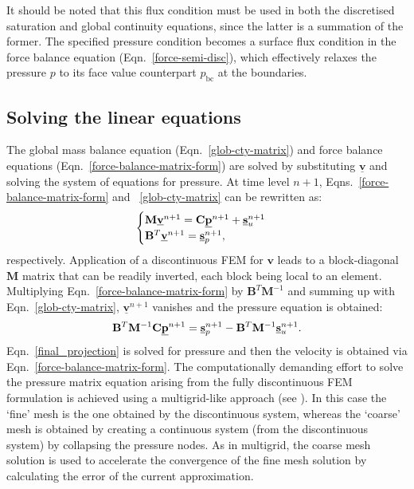 \documentclass[times]{fldauth}
\begin{document}
It should be noted that this flux condition must be used in both the
discretised saturation and global continuity equations, since the
latter is a summation of the former. The specified pressure condition
becomes a surface flux condition in the force balance equation
(Eqn.~\ref{force-semi-disc}), which effectively relaxes the pressure
$p$ to its face value counterpart $p_\text{bc}$ at the boundaries.


\subsection{Solving the linear equations}\label{Section:SolvingLinearEqns}
The global mass balance equation (Eqn.~\ref{glob-cty-matrix}) and
force balance equations (Eqn.~\ref{force-balance-matrix-form}) are
solved by substituting $\underline{\mathbf v}$ and solving the system
of equations for pressure. At time level $n+1$,
Eqns.~\ref{force-balance-matrix-form} and ~\ref{glob-cty-matrix} can
be rewritten as:
\begin{displaymath}
  \begin{cases}
    \mathbf{M} \underline{\bf v}^{n+1} = \mathbf{C}\underline{\bf
      p}^{n+1} + \underline{\bf s}_{u}^{n+1} \\ \mathbf{B}^{T}
    \underline{\bf v}^{n+1} = \underline{\bf s}_{p}^{n+1},
  \end{cases}
\end{displaymath}
respectively. Application of a discontinuous FEM for
$\mathbf{v}$ leads to a block-diagonal $\mathbf{M}$ matrix that
can be readily inverted, each block being local to an
element. Multiplying Eqn.~\ref{force-balance-matrix-form} by
$\mathbf{B}^{T}\mathbf{M}^{-1}$ and summing up with
Eqn.~\ref{glob-cty-matrix}, $\underline{\mathbf v}^{n+1}$
vanishes and the pressure equation is obtained:
\begin{equation}
  \mathbf{B}^{T}\mathbf{M}^{-1} \mathbf{C} \underline{\bf p}^{n+1} =
  \underline{\bf s}_{p}^{n+1} - \mathbf{B}^{T} \mathbf{M}^{-1}
  \underline{\bf s}_{u}^{n+1}.
  \label{final_projection}
\end{equation}
Eqn.~\ref{final_projection} is solved for pressure and then the
velocity is obtained via Eqn.~\ref{force-balance-matrix-form}. The
computationally demanding effort to solve the pressure matrix equation
arising from the fully discontinuous FEM formulation is achieved using
a multigrid-like approach (see \cite{Brandt}). In this case the
`fine' mesh is the one obtained by the discontinuous system, whereas
the `coarse' mesh is obtained by creating a continuous system (from
the discontinuous system) by collapsing the pressure nodes. As in
multigrid, the coarse mesh solution is used to accelerate the
convergence of the fine mesh solution by calculating the error of the
current approximation.
\end{document}
